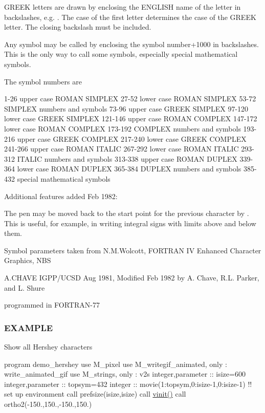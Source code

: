 G\+R\+E\+EK letters are drawn by enclosing the E\+N\+G\+L\+I\+SH name of the letter in backslashes, e.\+g. . The case of the first letter determines the case of the G\+R\+E\+EK letter. The closing backslash must be included.

Any symbol may be called by enclosing the symbol number+1000 in backslashes. This is the only way to call some symbols, especially special mathematical symbols.

The symbol numbers are

1-\/26 upper case R\+O\+M\+AN S\+I\+M\+P\+L\+EX 27-\/52 lower case R\+O\+M\+AN S\+I\+M\+P\+L\+EX 53-\/72 S\+I\+M\+P\+L\+EX numbers and symbols 73-\/96 upper case G\+R\+E\+EK S\+I\+M\+P\+L\+EX 97-\/120 lower case G\+R\+E\+EK S\+I\+M\+P\+L\+EX 121-\/146 upper case R\+O\+M\+AN C\+O\+M\+P\+L\+EX 147-\/172 lower case R\+O\+M\+AN C\+O\+M\+P\+L\+EX 173-\/192 C\+O\+M\+P\+L\+EX numbers and symbols 193-\/216 upper case G\+R\+E\+EK C\+O\+M\+P\+L\+EX 217-\/240 lower case G\+R\+E\+EK C\+O\+M\+P\+L\+EX 241-\/266 upper case R\+O\+M\+AN I\+T\+A\+L\+IC 267-\/292 lower case R\+O\+M\+AN I\+T\+A\+L\+IC 293-\/312 I\+T\+A\+L\+IC numbers and symbols 313-\/338 upper case R\+O\+M\+AN D\+U\+P\+L\+EX 339-\/364 lower case R\+O\+M\+AN D\+U\+P\+L\+EX 365-\/384 D\+U\+P\+L\+EX numbers and symbols 385-\/432 special mathematical symbols

Additional features added Feb 1982\+:

The pen may be moved back to the start point for the previous character by . This is useful, for example, in writing integral signs with limits above and below them.

Symbol parameters taken from N.\+M.\+Wolcott, F\+O\+R\+T\+R\+AN IV Enhanced Character Graphics, N\+BS

A.\+C\+H\+A\+VE I\+G\+P\+P/\+U\+C\+SD Aug 1981, Modified Feb 1982 by A. Chave, R.\+L. Parker, and L. Shure

programmed in F\+O\+R\+T\+R\+A\+N-\/77 \subsubsection*{E\+X\+A\+M\+P\+LE}

Show all Hershey characters

program demo\+\_\+hershey use M\+\_\+pixel use M\+\_\+writegif\+\_\+animated, only \+: write\+\_\+animated\+\_\+gif use M\+\_\+strings, only \+: v2s integer,parameter \+:\+: isize=600 integer,parameter \+:\+: topsym=432 integer \+:\+: movie(1\+:topsym,0\+:isize-\/1,0\+:isize-\/1) !! set up environment call prefsize(isize,isize) call \hyperlink{namespacem__pixel_ac03ca8f23fdadb60599b6ea4dc87a6d9}{vinit()} call ortho2(-\/150.,150.,-\/150.,150.)


